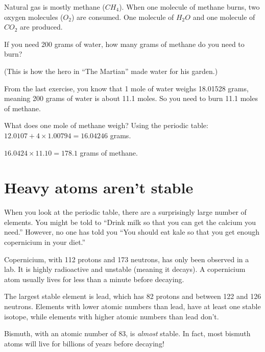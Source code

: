 \begin{Exercise}[title={Burning Methane}, label=burning_methane]

Natural gas is mostly methane ($CH_4$). When one molecule of methane
burns, two oxygen molecules ($O_2$) are consumed. One molecule of
$H_2O$ and one molecule of $CO_2$ are produced.

If you need 200 grams of water, how many grams of methane do you need
to burn?

(This is how the hero in ``The Martian'' made water for his garden.)


\end{Exercise}
\begin{Answer}[ref=burning_methane]

From the last exercise, you know that 1 mole of water weighs 18.01528
grams, meaning 200 grams of water is about 11.1 moles. So you need to burn
11.1 moles of methane.

What does one mole of methane weigh? Using the periodic table:
$12.0107 + 4 \times 1.00794 = 16.04246$ grams.

$16.0424 \times 11.10 = 178.1$ grams of methane.

\end{Answer}

\section{Heavy atoms aren't stable}

When you look at the periodic table, there are a surprisingly large
number of elements. You might be told to ``Drink milk so that you can
get the calcium you need.'' However, no one has told you ``You should
eat kale so that you get enough copernicium in your diet.''

Copernicium, with 112 protons and 173 neutrons, has only been observed
 in a lab. It is highly radioactive and unstable (meaning it decays). A copernicium
atom usually lives for less than a minute before decaying.

The largest stable element is lead, which has 82 protons and between
122 and 126 neutrons. Elements with lower atomic numbers than lead,
have at least one stable isotope, while elements with higher atomic numbers
than lead don't.

Bismuth, with an atomic number of 83, is \textit{almost} stable. In fact, most
bismuth atoms will live for billions of years before decaying!
